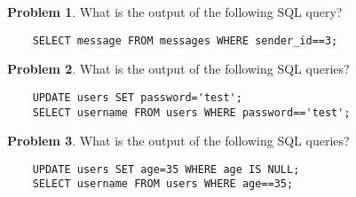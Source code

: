 \documentclass[10pt]{article}
\theoremstyle{definition}
\newtheorem{problem}{Problem}
\begin{document}
\newpage
\begin{problem}
    What is the output of the following SQL query?
    \begin{lstlisting}
    SELECT message FROM messages WHERE sender_id==3;
    \end{lstlisting}
    \vspace{2in}
\end{problem}

\begin{problem}
    What is the output of the following SQL queries?
    \begin{lstlisting}
    UPDATE users SET password='test';
    SELECT username FROM users WHERE password=='test';
    \end{lstlisting}
    \vspace{2in}
\end{problem}

\begin{problem}
    What is the output of the following SQL queries?
    \begin{lstlisting}
    UPDATE users SET age=35 WHERE age IS NULL;
    SELECT username FROM users WHERE age==35;
    \end{lstlisting}
    \vspace{2in}
\end{problem}
\end{document}
